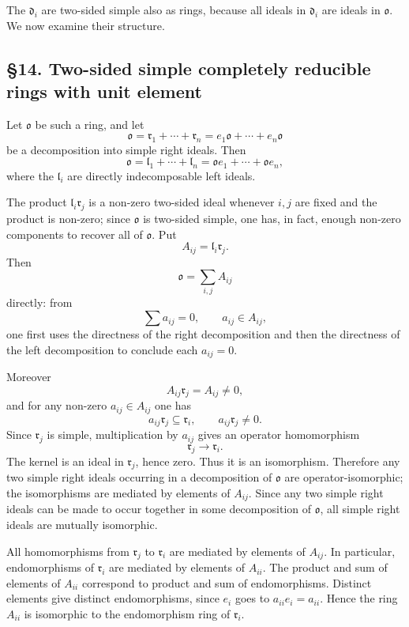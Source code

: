 \documentclass[11pt]{article}
\begin{document}
The \(\mathfrak d_i\) are two-sided simple also as rings, because all
ideals in \(\mathfrak d_i\) are ideals in \(\mathfrak{o}\). We now
examine their structure.

\subsection{§14. Two-sided simple completely reducible rings with unit
element}\label{two-sided-simple-completely-reducible-rings-with-unit-element}

Let \(\mathfrak{o}\) be such a ring, and let \[
  \mathfrak{o}=\mathfrak r_1+\cdots+\mathfrak r_n=e_1\mathfrak{o}+\cdots+e_n\mathfrak{o}
\] be a decomposition into simple right ideals. Then \[
  \mathfrak{o}=\mathfrak l_1+\cdots+\mathfrak l_n
      =\mathfrak{o}e_1+\cdots+\mathfrak{o}e_n,
\] where the \(\mathfrak l_i\) are directly indecomposable left ideals.

The product \(\mathfrak l_i\mathfrak r_j\) is a non-zero two-sided ideal
whenever \(i,j\) are fixed and the product is non-zero; since
\(\mathfrak{o}\) is two-sided simple, one has, in fact, enough non-zero
components to recover all of \(\mathfrak{o}\). Put \[
  A_{ij}=\mathfrak l_i\mathfrak r_j.
\] Then \[
  \mathfrak{o}=\sum_{i,j} A_{ij}
\] directly: from \[
  \sum a_{ij}=0,
  \qquad a_{ij}\in A_{ij},
\] one first uses the directness of the right decomposition and then the
directness of the left decomposition to conclude each \(a_{ij}=0\).

Moreover \[
  A_{ij}\mathfrak r_j=A_{ij}\ne0,
\] and for any non-zero \(a_{ij}\in A_{ij}\) one has \[
  a_{ij}\mathfrak r_j\subseteq\mathfrak r_i,
  \qquad
  a_{ij}\mathfrak r_j\ne0.
\] Since \(\mathfrak r_j\) is simple, multiplication by \(a_{ij}\) gives
an operator homomorphism \[
  \mathfrak r_j\to\mathfrak r_i.
\] The kernel is an ideal in \(\mathfrak r_j\), hence zero. Thus it is
an isomorphism. Therefore any two simple right ideals occurring in a
decomposition of \(\mathfrak{o}\) are operator-isomorphic; the
isomorphisms are mediated by elements of \(A_{ij}\). Since any two
simple right ideals can be made to occur together in some decomposition
of \(\mathfrak{o}\), all simple right ideals are mutually isomorphic.

All homomorphisms from \(\mathfrak r_j\) to \(\mathfrak r_i\) are
mediated by elements of \(A_{ij}\). In particular, endomorphisms of
\(\mathfrak r_i\) are mediated by elements of \(A_{ii}\). The product
and sum of elements of \(A_{ii}\) correspond to product and sum of
endomorphisms. Distinct elements give distinct endomorphisms, since
\(e_i\) goes to \(a_{ii}e_i=a_{ii}\). Hence the ring \(A_{ii}\) is
isomorphic to the endomorphism ring of \(\mathfrak r_i\).
\end{document}
